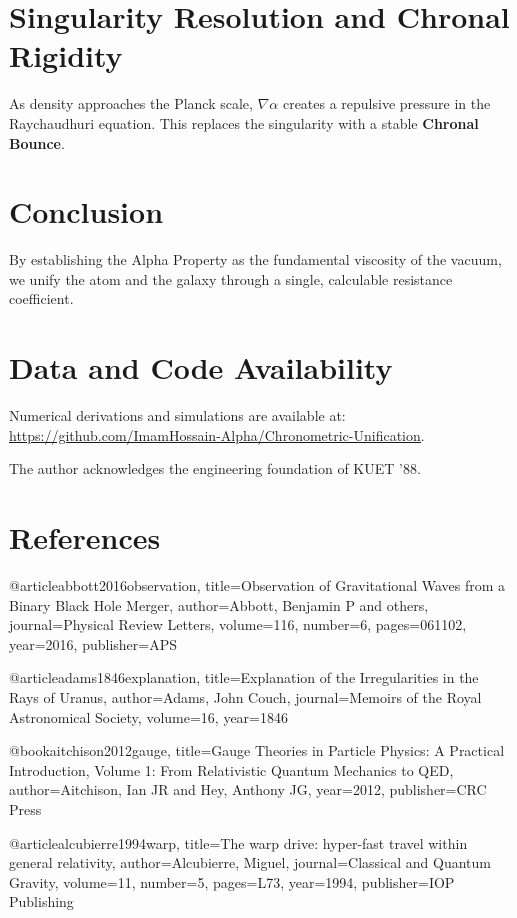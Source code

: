 \documentclass[aps,prresearch,reprint,onecolumn,superscriptaddress,nofootinbib,12pt]{revtex4-2}
\begin{document}
\section{Singularity Resolution and Chronal Rigidity}
As density approaches the Planck scale, $\nabla \alpha$ creates a repulsive pressure in the Raychaudhuri equation. This replaces the singularity with a stable \textbf{Chronal Bounce}.

\section{Conclusion}
By establishing the Alpha Property as the fundamental viscosity of the vacuum, we unify the atom and the galaxy through a single, calculable resistance coefficient. 

\section*{Data and Code Availability}
Numerical derivations and simulations are available at: \url{https://github.com/ImamHossain-Alpha/Chronometric-Unification}.

\begin{acknowledgments}
The author acknowledges the engineering foundation of KUET '88.
\end{acknowledgments}
\clearpage
\section*{References} %


@article{abbott2016observation,
  title={Observation of Gravitational Waves from a Binary Black Hole Merger},
  author={Abbott, Benjamin P and others},
  journal={Physical Review Letters},
  volume={116},
  number={6},
  pages={061102},
  year={2016},
  publisher={APS}
}

@article{adams1846explanation,
  title={Explanation of the Irregularities in the Rays of Uranus},
  author={Adams, John Couch},
  journal={Memoirs of the Royal Astronomical Society},
  volume={16},
  year={1846}
}

@book{aitchison2012gauge,
  title={Gauge Theories in Particle Physics: A Practical Introduction, Volume 1: From Relativistic Quantum Mechanics to QED},
  author={Aitchison, Ian JR and Hey, Anthony JG},
  year={2012},
  publisher={CRC Press}
}

@article{alcubierre1994warp,
  title={The warp drive: hyper-fast travel within general relativity},
  author={Alcubierre, Miguel},
  journal={Classical and Quantum Gravity},
  volume={11},
  number={5},
  pages={L73},
  year={1994},
  publisher={IOP Publishing}
}
\end{document}
